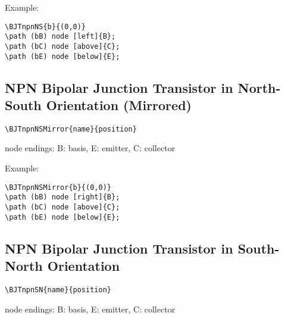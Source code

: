 \documentclass[parskip=full]{scrartcl}
\begin{document}
Example:\\
\begin{minipage}{0.8\textwidth}
\begin{verbatim}
\BJTnpnNS{b}{(0,0)}
\path (bB) node [left]{B};
\path (bC) node [above]{C};
\path (bE) node [below]{E};
\end{verbatim}
\end{minipage}
\begin{minipage}{0.19\textwidth}
\end{minipage}

\subsection{NPN Bipolar Junction Transistor in North-South Orientation (Mirrored)}

\begin{verbatim}
\BJTnpnNSMirror{name}{position}
\end{verbatim}
node endings: B: basis, E: emitter, C: collector

Example:\\
\begin{minipage}{0.8\textwidth}
\begin{verbatim}
\BJTnpnNSMirror{b}{(0,0)}
\path (bB) node [right]{B};
\path (bC) node [above]{C};
\path (bE) node [below]{E};
\end{verbatim}
\end{minipage}
\begin{minipage}{0.19\textwidth}
\end{minipage}

\subsection{NPN Bipolar Junction Transistor in South-North Orientation}

\begin{verbatim}
\BJTnpnSN{name}{position}
\end{verbatim}
node endings: B: basis, E: emitter, C: collector
\end{document}
